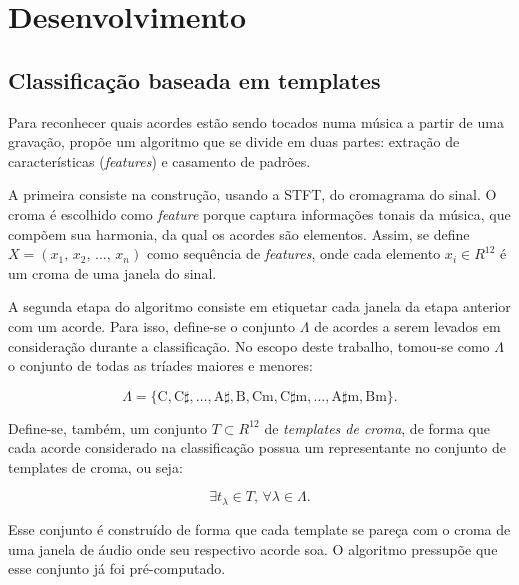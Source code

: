 \chapter{Desenvolvimento}
\label{cap:desenvolvimento}

\section{Classificação baseada em templates}
\label{sec:classificador}

    Para reconhecer quais acordes estão sendo tocados numa música a partir de uma gravação, \cite{muller} propõe um algoritmo que se divide em duas partes: extração de características (\textit{features}) e casamento de padrões.

    A primeira consiste na construção, usando a STFT, do cromagrama do sinal. O croma é escolhido como \textit{feature} porque captura informações tonais da música, que compõem sua harmonia, da qual os acordes são elementos. Assim, se define $X = (x_1\textrm{, }x_2\textrm{, }\dots\textrm{, }x_n)$ como sequência de \textit{features}, onde cada elemento $x_i \in R^{12}$ é um croma de uma janela do sinal.

    A segunda etapa do algoritmo consiste em etiquetar cada janela da etapa anterior com um acorde. Para isso, define-se o conjunto $\Lambda$ de acordes a serem levados em consideração durante a classificação. No escopo deste trabalho, tomou-se como $\Lambda$ o conjunto de todas as tríades maiores e menores:

    \begin{equation}\label{Lambda}
        \Lambda = \{
            \textrm{C},
            \textrm{C}\sharp,
            \dots,
            \textrm{A}\sharp,
            \textrm{B},
            \textrm{Cm},
            \textrm{C}\sharp\textrm{m},
            \dots,
            \textrm{A}\sharp\textrm{m},
            \textrm{Bm}
        \}\mbox{.}
    \end{equation}
    
    Define-se, também, um conjunto $T \subset R^{12}$ de \textit{templates de croma}, de forma que cada acorde considerado na classificação possua um representante no conjunto de templates de croma, ou seja:
    
    \[
      \exists t_\lambda \in T \textrm{, } \forall \lambda \in \Lambda\mbox{.}
    \]
    
    Esse conjunto é construído de forma que cada template se pareça com o croma de uma janela de áudio onde seu respectivo acorde soa. O algoritmo pressupõe que esse conjunto já foi pré-computado.
    
